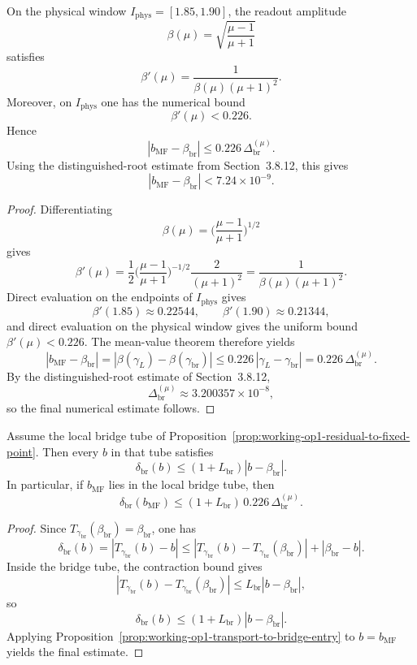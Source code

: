 \begin{proposition}
\label{prop:working-op1-transport-to-bridge-entry}
On the physical window \(I_{\mathrm{phys}}=[1.85,1.90]\), the readout amplitude
\[
  \beta(\mu)=\sqrt{\frac{\mu-1}{\mu+1}}
\]
satisfies
\[
  \beta'(\mu)=\frac{1}{\beta(\mu)(\mu+1)^2}.
\]
Moreover, on \(I_{\mathrm{phys}}\) one has the numerical bound
\[
  \beta'(\mu)<0.226.
\]
Hence
\[
  |b_{\mathrm{MF}}-\beta_{\mathrm{br}}|
  \le
  0.226\,\Delta^{(\mu)}_{\mathrm{br}}.
\]
Using the distinguished-root estimate from Section~3.8.12, this gives
\[
  |b_{\mathrm{MF}}-\beta_{\mathrm{br}}|
  <7.24\times10^{-9}.
\]
\end{proposition}

\begin{proof}
Differentiating
\[
  \beta(\mu)=\biggl(\frac{\mu-1}{\mu+1}\biggr)^{1/2}
\]
gives
\[
  \beta'(\mu)
  =
  \frac{1}{2}\biggl(\frac{\mu-1}{\mu+1}\biggr)^{-1/2}\frac{2}{(\mu+1)^2}
  =
  \frac{1}{\beta(\mu)(\mu+1)^2}.
\]
Direct evaluation on the endpoints of \(I_{\mathrm{phys}}\) gives
\[
  \beta'(1.85)\approx 0.22544,
  \qquad
  \beta'(1.90)\approx 0.21344,
\]
and direct evaluation on the physical window gives the uniform bound \(\beta'(\mu)<0.226\). The mean-value theorem therefore yields
\[
  |b_{\mathrm{MF}}-\beta_{\mathrm{br}}|
  =
  |\beta(\gamma_L)-\beta(\gamma_{\mathrm{br}})|
  \le
  0.226\,|\gamma_L-\gamma_{\mathrm{br}}|
  =
  0.226\,\Delta^{(\mu)}_{\mathrm{br}}.
\]
By the distinguished-root estimate of Section~3.8.12,
\[
  \Delta^{(\mu)}_{\mathrm{br}}
  \approx 3.200357\times10^{-8},
\]
so the final numerical estimate follows.
\end{proof}

\begin{proposition}
\label{prop:working-op1-rounded-defect}
Assume the local bridge tube of Proposition~\ref{prop:working-op1-residual-to-fixed-point}. Then every \(b\) in that tube satisfies
\[
  \delta_{\mathrm{br}}(b)
  \le
  (1+L_{\mathrm{br}})|b-\beta_{\mathrm{br}}|.
\]
In particular, if \(b_{\mathrm{MF}}\) lies in the local bridge tube, then
\[
  \delta_{\mathrm{br}}(b_{\mathrm{MF}})
  \le
  (1+L_{\mathrm{br}})\,0.226\,\Delta^{(\mu)}_{\mathrm{br}}.
\]
\end{proposition}

\begin{proof}
Since \(T_{\gamma_{\mathrm{br}}}(\beta_{\mathrm{br}})=\beta_{\mathrm{br}}\), one has
\[
  \delta_{\mathrm{br}}(b)
  =
  |T_{\gamma_{\mathrm{br}}}(b)-b|
  \le
  |T_{\gamma_{\mathrm{br}}}(b)-T_{\gamma_{\mathrm{br}}}(\beta_{\mathrm{br}})|
  +|\beta_{\mathrm{br}}-b|.
\]
Inside the bridge tube, the contraction bound gives
\[
  |T_{\gamma_{\mathrm{br}}}(b)-T_{\gamma_{\mathrm{br}}}(\beta_{\mathrm{br}})|
  \le
  L_{\mathrm{br}}|b-\beta_{\mathrm{br}}|,
\]
so
\[
  \delta_{\mathrm{br}}(b)
  \le
  (1+L_{\mathrm{br}})|b-\beta_{\mathrm{br}}|.
\]
Applying Proposition~\ref{prop:working-op1-transport-to-bridge-entry} to \(b=b_{\mathrm{MF}}\) yields the final estimate.
\end{proof}


